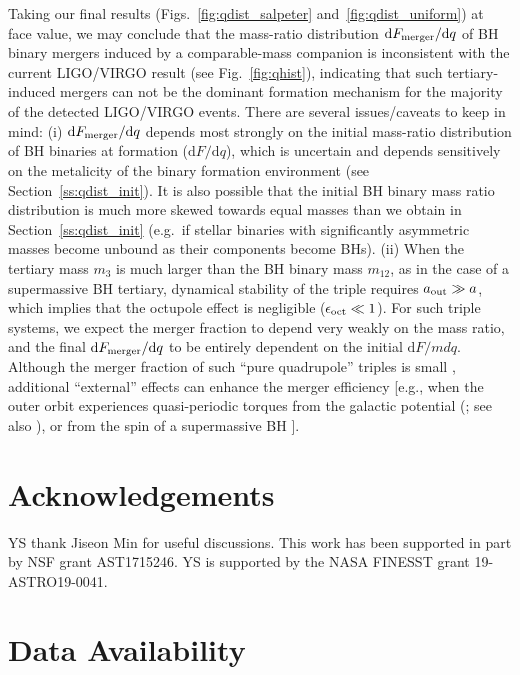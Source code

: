 \documentclass[
        fleqn,
        usenatbib,
    ]{mnras}
\newcommand*{\md}[0]{\mathrm{d}}
\begin{document}
Taking our final results (Figs.~\ref{fig:qdist_salpeter}
and~\ref{fig:qdist_uniform}) at face value, we may conclude that the mass-ratio
distribution $\md F_{\rm merger}/\md q$ of BH binary mergers induced by a
comparable-mass companion is inconsistent with the current LIGO/VIRGO result
(see Fig.~\ref{fig:qhist}), indicating that such tertiary-induced mergers can
not be the dominant formation mechanism for the majority of the detected
LIGO/VIRGO events.  There are several issues/caveats to keep in mind: (i) $\md
F_{\rm merger}/\md q$ depends most strongly on the initial mass-ratio
distribution of BH binaries at formation ($\md F/\md q$), which is uncertain and
depends sensitively on the metalicity of the binary formation environment (see
Section~\ref{ss:qdist_init}). It is also possible that the initial BH binary
mass ratio distribution is much more skewed towards equal masses than we obtain
in Section~\ref{ss:qdist_init} (e.g.\ if stellar binaries with significantly
asymmetric masses become unbound as their components become BHs). (ii) When the
tertiary mass $m_3$ is much larger than the BH binary mass $m_{12}$, as in the
case of a supermassive BH tertiary, dynamical stability of the triple requires
$a_{\rm out} \gg a$, which implies that the octupole effect is negligible
($\epsilon_{\rm oct}\ll 1$). For such triple systems, we expect the merger
fraction to depend very weakly on the mass ratio, and the final $\md F_{\rm
merger}/\md q$ to be entirely dependent on the initial $\md F/md q$. Although
the merger fraction of such ``pure quadrupole'' triples is small
\citep[$\lesssim 6\%$; see Eq.~53 of][]{LL18},
additional ``external'' effects can enhance the merger efficiency [e.g., when
the outer orbit experiences quasi-periodic torques from the galactic potential
(\citealp{petrovich2017greatly}; see also \citealp{hamers2017secular}), or from
the spin of a supermassive BH \citep{bin_misc5}].

\section{Acknowledgements}\label{s:ack}

YS thank Jiseon Min for useful discussions. This work has been supported in part
by NSF grant AST1715246. YS is supported by the NASA FINESST grant
19-ASTRO19-0041.%

\section{Data Availability}
\end{document}
